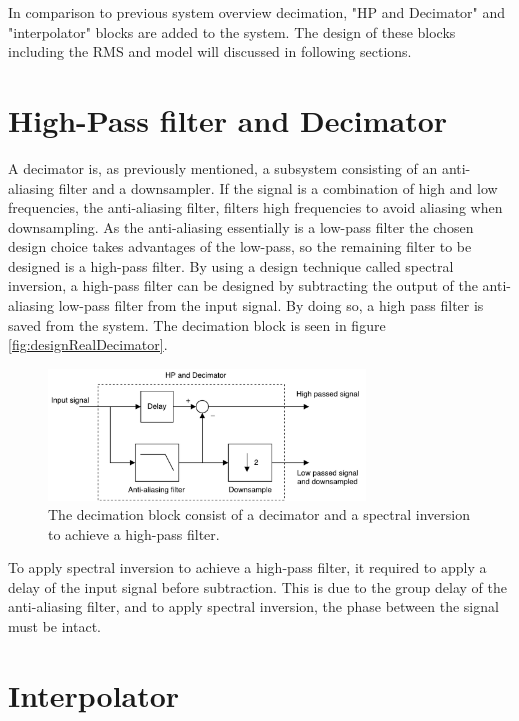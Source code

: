 In comparison to previous system overview decimation, "HP and Decimator" and "interpolator" blocks are added to the system. The design of these blocks including the RMS and model will discussed in following sections.


\section{High-Pass filter and Decimator}

A decimator is, as previously mentioned, a subsystem consisting of an anti-aliasing filter and a downsampler. If the signal is a combination of high and low frequencies, the anti-aliasing filter, filters high frequencies to avoid aliasing when downsampling. As the anti-aliasing essentially is a low-pass filter the chosen design choice takes advantages of the low-pass, so the remaining filter to be designed is a high-pass filter. By using a design technique called spectral inversion, a high-pass filter can be designed by subtracting the output of the anti-aliasing low-pass filter from the input signal. By doing so, a high pass filter is saved from the system. The decimation block is seen in figure \autoref{fig:designRealDecimator}.

\begin{figure}[H]
\centering
\includegraphics[width=0.75\textwidth]{figures/designRealDecimator.pdf}
\caption{The decimation block consist of a decimator and a spectral inversion to achieve a high-pass filter.}
\label{fig:designRealDecimator}
\end{figure}

To apply spectral inversion to achieve a high-pass filter, it required to apply a delay of the input signal before subtraction. This is due to the group delay of the anti-aliasing filter, and to apply spectral inversion, the phase between the signal must be intact.


\section{Interpolator}

